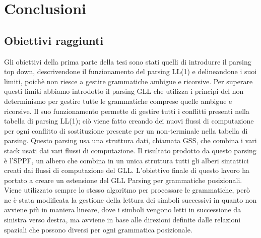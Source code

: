\chapter{Conclusioni}
\section{Obiettivi raggiunti}
Gli obiettivi della prima parte della tesi sono stati quelli di introdurre il parsing top down, descrivendone il funzionamento del parsing LL(1) e delineandone i suoi limiti, poichè non riesce a gestire grammatiche ambigue e ricorsive. Per superare questi limiti abbiamo introdotto il parsing GLL che utilizza i principi del non determinismo per gestire tutte le grammatiche comprese quelle ambigue e ricorsive. Il suo funzionamento permette di gestire tutti i conflitti presenti nella tabella di parsing LL(1); ciò viene fatto creando dei nuovi flussi di computazione per ogni conflitto di sostituzione presente per un non-terminale nella tabella di parsing. Questo parsing usa una struttura dati, chiamata GSS, che combina i vari stack usati dai vari flussi di computazione. Il risultato prodotto da questo parsing è l'SPPF, un albero che combina in un unica struttura tutti gli alberi sintattici creati dai flussi di computazione del GLL. L'obiettivo finale di questo lavoro ha portato a creare un estensione del GLL Parsing per grammatiche posizionali. Viene utilizzato sempre lo stesso algoritmo per processare le grammatiche, però ne è stata modificata la gestione della lettura dei simboli successivi in quanto non avviene più in maniera lineare, dove i simboli vengono letti in successione da sinistra verso destra, ma avviene in base alle direzioni definite dalle relazioni spaziali che possono diversi per ogni grammatica posizionale.